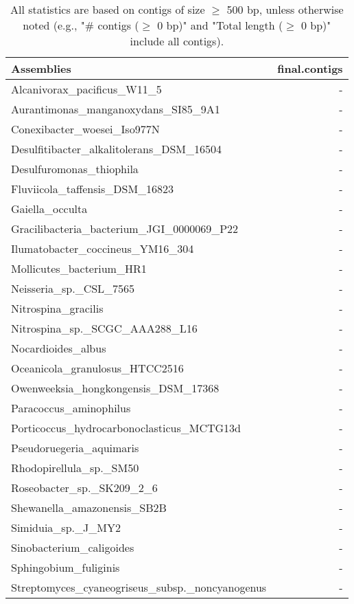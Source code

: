 \documentclass[12pt,a4paper]{article}
\begin{document}
\begin{table}[ht]
\begin{center}
\caption{All statistics are based on contigs of size $\geq$ 500 bp, unless otherwise noted (e.g., "\# contigs ($\geq$ 0 bp)" and "Total length ($\geq$ 0 bp)" include all contigs).}
\begin{tabular}{|l*{1}{|r}|}
\hline
Assemblies & final.contigs \\ \hline
Alcanivorax\_pacificus\_W11\_5 & - \\ \hline
Aurantimonas\_manganoxydans\_SI85\_9A1 & - \\ \hline
Conexibacter\_woesei\_Iso977N & - \\ \hline
Desulfitibacter\_alkalitolerans\_DSM\_16504 & - \\ \hline
Desulfuromonas\_thiophila & - \\ \hline
Fluviicola\_taffensis\_DSM\_16823 & - \\ \hline
Gaiella\_occulta & - \\ \hline
Gracilibacteria\_bacterium\_JGI\_0000069\_P22 & - \\ \hline
Ilumatobacter\_coccineus\_YM16\_304 & - \\ \hline
Mollicutes\_bacterium\_HR1 & - \\ \hline
Neisseria\_sp.\_CSL\_7565 & - \\ \hline
Nitrospina\_gracilis & - \\ \hline
Nitrospina\_sp.\_SCGC\_AAA288\_L16 & - \\ \hline
Nocardioides\_albus & - \\ \hline
Oceanicola\_granulosus\_HTCC2516 & - \\ \hline
Owenweeksia\_hongkongensis\_DSM\_17368 & - \\ \hline
Paracoccus\_aminophilus & - \\ \hline
Porticoccus\_hydrocarbonoclasticus\_MCTG13d & - \\ \hline
Pseudoruegeria\_aquimaris & - \\ \hline
Rhodopirellula\_sp.\_SM50 & - \\ \hline
Roseobacter\_sp.\_SK209\_2\_6 & - \\ \hline
Shewanella\_amazonensis\_SB2B & - \\ \hline
Simiduia\_sp.\_J\_MY2 & - \\ \hline
Sinobacterium\_caligoides & - \\ \hline
Sphingobium\_fuliginis & - \\ \hline
Streptomyces\_cyaneogriseus\_subsp.\_noncyanogenus & - \\ \hline

\end{tabular}
\end{center}
\end{table}
\end{document}
